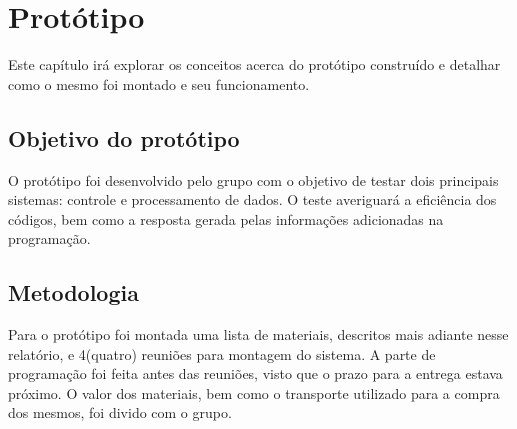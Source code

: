 \chapter{Protótipo}

Este capítulo irá explorar os conceitos acerca do protótipo construído e detalhar como o mesmo foi montado e seu funcionamento.

\section{Objetivo do protótipo}
O protótipo foi desenvolvido pelo grupo com o objetivo de testar dois principais sistemas: controle e processamento de dados. O teste averiguará a eficiência dos códigos, bem como a resposta gerada pelas informações adicionadas na programação.
\section{Metodologia}
Para o protótipo foi montada uma lista de materiais, descritos mais adiante nesse relatório, e 4(quatro) reuniões para montagem do sistema. A parte de programação foi feita antes das reuniões, visto que o prazo para a entrega estava próximo. O valor dos materiais, bem como o transporte utilizado para a compra dos mesmos, foi divido com o grupo.
